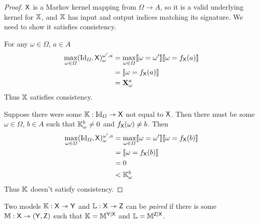 \begin{proof}
$\mathsf{X}$ is a Markov kernel mapping from $\Omega\to A$, so it is a valid underlying kernel for $\mathbb{X}$, and $\mathbb{X}$ has input and output indices matching its signature. We need to show it satisfies consistency.

For any $\omega\in \Omega$, $a\in A$
\begin{align}
	\max_{\omega\in \Omega}(\text{Id}_\Omega,\mathsf{X})_{\omega}^{\omega',a} &= \max_{\omega\in \Omega} \llbracket \omega = \omega' \rrbracket \llbracket \omega = f_{\mathsf{X}}(a) \rrbracket\\
	&= \llbracket \omega = f_{\mathsf{X}}(a) \rrbracket\\
	&= \mathbf{X}_\omega^a
\end{align}
Thus $\mathbb{X}$ satisfies consistency.

Suppose there were some $\mathbb{K}:\text{Id}_\Omega\rightarrowtriangle \mathsf{X}$ not equal to $\mathsf{X}$. Then there must be some $\omega\in \Omega$, $b\in A$ such that $\mathbb{K}_\omega^b\neq 0$ and $f_{\mathsf{X}}(\omega)\neq b$. Then
\begin{align}
	\max_{\omega\in \Omega}(\text{Id}_\Omega,\mathsf{X})_{\omega}^{\omega',a} &= \max_{\omega\in \Omega} \llbracket \omega = \omega' \rrbracket \llbracket \omega = f_{\mathsf{X}}(b) \rrbracket\\
	&= \llbracket \omega = f_{\mathsf{X}}(b) \rrbracket\\
	&= 0\\
	&< \mathbb{K}_\omega^b
\end{align}
Thus $\mathbb{K}$ doesn't satisfy consistency.
\end{proof}



\begin{definition}[Pairing]\label{def:pairing}
Two models $\mathbb{K}:\mathsf{X}\rightarrowtriangle \mathsf{Y}$ and $\mathbb{L}:\mathsf{X}\rightarrowtriangle \mathsf{Z}$ can be \emph{paired} if there is some $\mathbb{M}:\mathsf{X}\rightarrowtriangle (\mathsf{Y},\mathsf{Z})$ such that $\mathbb{K}=\mathbb{M}^{\mathsf{Y}|\mathsf{X}}$ and $\mathbb{L}=\mathbb{M}^{\mathsf{Z}|\mathsf{X}}$.
\end{definition}

